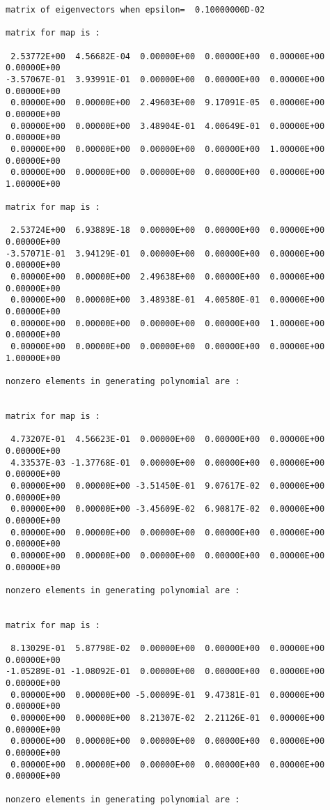 \begin{footnotesize}
\begin{verbatim}
matrix of eigenvectors when epsilon=  0.10000000D-02

matrix for map is :

 2.53772E+00  4.56682E-04  0.00000E+00  0.00000E+00  0.00000E+00  0.00000E+00
-3.57067E-01  3.93991E-01  0.00000E+00  0.00000E+00  0.00000E+00  0.00000E+00
 0.00000E+00  0.00000E+00  2.49603E+00  9.17091E-05  0.00000E+00  0.00000E+00
 0.00000E+00  0.00000E+00  3.48904E-01  4.00649E-01  0.00000E+00  0.00000E+00
 0.00000E+00  0.00000E+00  0.00000E+00  0.00000E+00  1.00000E+00  0.00000E+00
 0.00000E+00  0.00000E+00  0.00000E+00  0.00000E+00  0.00000E+00  1.00000E+00

matrix for map is :

 2.53724E+00  6.93889E-18  0.00000E+00  0.00000E+00  0.00000E+00  0.00000E+00
-3.57071E-01  3.94129E-01  0.00000E+00  0.00000E+00  0.00000E+00  0.00000E+00
 0.00000E+00  0.00000E+00  2.49638E+00  0.00000E+00  0.00000E+00  0.00000E+00
 0.00000E+00  0.00000E+00  3.48938E-01  4.00580E-01  0.00000E+00  0.00000E+00
 0.00000E+00  0.00000E+00  0.00000E+00  0.00000E+00  1.00000E+00  0.00000E+00
 0.00000E+00  0.00000E+00  0.00000E+00  0.00000E+00  0.00000E+00  1.00000E+00

nonzero elements in generating polynomial are :


matrix for map is :

 4.73207E-01  4.56623E-01  0.00000E+00  0.00000E+00  0.00000E+00  0.00000E+00
 4.33537E-03 -1.37768E-01  0.00000E+00  0.00000E+00  0.00000E+00  0.00000E+00
 0.00000E+00  0.00000E+00 -3.51450E-01  9.07617E-02  0.00000E+00  0.00000E+00
 0.00000E+00  0.00000E+00 -3.45609E-02  6.90817E-02  0.00000E+00  0.00000E+00
 0.00000E+00  0.00000E+00  0.00000E+00  0.00000E+00  0.00000E+00  0.00000E+00
 0.00000E+00  0.00000E+00  0.00000E+00  0.00000E+00  0.00000E+00  0.00000E+00

nonzero elements in generating polynomial are :


matrix for map is :

 8.13029E-01  5.87798E-02  0.00000E+00  0.00000E+00  0.00000E+00  0.00000E+00
-1.05289E-01 -1.08092E-01  0.00000E+00  0.00000E+00  0.00000E+00  0.00000E+00
 0.00000E+00  0.00000E+00 -5.00009E-01  9.47381E-01  0.00000E+00  0.00000E+00
 0.00000E+00  0.00000E+00  8.21307E-02  2.21126E-01  0.00000E+00  0.00000E+00
 0.00000E+00  0.00000E+00  0.00000E+00  0.00000E+00  0.00000E+00  0.00000E+00
 0.00000E+00  0.00000E+00  0.00000E+00  0.00000E+00  0.00000E+00  0.00000E+00

nonzero elements in generating polynomial are :



\end{verbatim}
\end{footnotesize}
